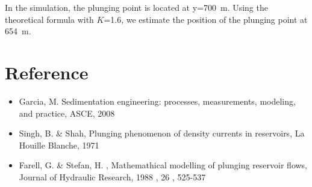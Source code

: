 In the simulation, the plunging point is located at y=700~m. Using the theoretical formula with $K$=1.6, we estimate the position of the plunging point at 654~m.




\section{Reference}

\begin{itemize}
\item  Garcia, M. Sedimentation engineering: processes, measurements, modeling, and practice, ASCE, 2008
\item Singh, B. \& Shah, Plunging phenomenon of density currents in reservoirs, La Houille Blanche, 1971
\item Farell, G. \& Stefan, H. , Mathemathical modelling of plunging reservoir flows, Journal of Hydraulic Research, 1988 , 26 , 525-537

\end{itemize}



